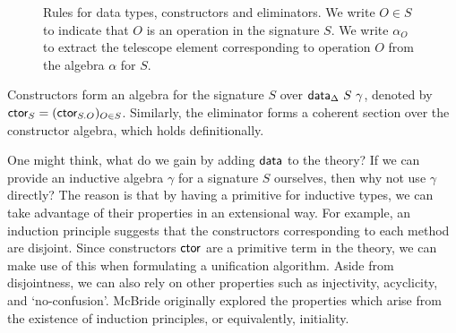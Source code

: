 \begin{figure}[t]
\caption{Rules for data types, constructors and eliminators. We write $O \in S$
to indicate that $O$ is an operation in the signature $S$. We write $\alpha_O$
to extract the telescope element corresponding to operation $O$ from the algebra
$\alpha$ for $S$.}
\label{fig:data-rules}
\end{figure}

Constructors form an algebra for the signature $S$ over
$\textsf{data}_\Delta\ S\ \gamma$, denoted by $\textsf{ctor}_S = (\textsf{ctor}_{S.O})_{O \in S}$.
Similarly, the eliminator forms a coherent section over the constructor algebra,
which holds definitionally.

One might think, what do we gain by adding $\textsf{data}$ to the theory? If we can
provide an inductive algebra $\gamma$ for a signature $S$ ourselves, then why
not use $\gamma$ directly? The reason is that by having a primitive for
inductive types, we can take advantage of their properties in an extensional
way. For example, an induction principle suggests that the constructors
corresponding to each method are disjoint. Since constructors $\textsf{ctor}$ are a
primitive term in the theory, we can make use of this when formulating a
unification algorithm. Aside from disjointness, we can also rely on other
properties such as injectivity, acyclicity, and `no-confusion'. McBride
\cite{McBride2006-fp} originally explored the properties which arise from the
existence of induction principles, or equivalently, initiality.

